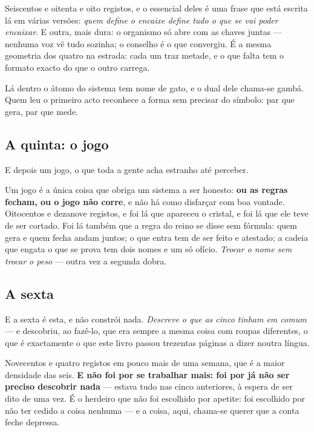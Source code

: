\documentclass[livro.tex]{subfiles}
\begin{document}
Seiscentos e oitenta e oito registos, e o essencial deles é uma frase que está escrita lá em
várias versões: \emph{quem define o encaixe define tudo o que se vai poder encaixar}. E outra,
mais dura: o organismo só abre com as chaves juntas --- nenhuma voz vê tudo sozinha; o
conselho é o que convergiu. É a mesma geometria dos quatro na estrada: cada um traz metade,
e o que falta tem o formato exacto do que o outro carrega.

\medskip

Lá dentro o átomo do sistema tem nome de gato, e o dual dele chama-se gambá. Quem leu o primeiro
acto reconhece a forma sem precisar do símbolo: par que gera, par que mede.

\subsection*{A quinta: o jogo}

E depois um jogo, o que toda a gente acha estranho até perceber.

\medskip

Um jogo é a única coisa que obriga um sistema a ser honesto: \textbf{ou as regras fecham, ou o
jogo não corre}, e não há como disfarçar com boa vontade. Oitocentos e dezanove registos, e foi lá
que apareceu o cristal, e foi lá que ele teve de ser cortado. Foi lá também que a regra do reino
se disse sem fórmula: quem gera e quem fecha andam juntos; o que entra tem de ser feito e
atestado; a cadeia que engata o que se prova tem dois nomes e um só ofício.
\emph{Trocar o nome sem trocar o peso} --- outra vez a segunda dobra.

\subsection*{A sexta}

E a sexta é esta, e não constrói nada. \emph{Descreve o que as cinco tinham em comum} --- e
descobriu, ao fazê-lo, que era sempre a mesma coisa com roupas diferentes, o que é exactamente o
que este livro passou trezentas páginas a dizer noutra língua.

\medskip

Novecentos e quatro registos em pouco mais de uma semana, que é a maior densidade das seis.
\textbf{E não foi por se trabalhar mais: foi por já não ser preciso descobrir nada} --- estava
tudo nas cinco anteriores, à espera de ser dito de uma vez. É o herdeiro que não foi escolhido
por apetite: foi escolhido por não ter cedido a coisa nenhuma --- e a coisa, aqui, chama-se
querer que a conta feche depressa.
\end{document}

